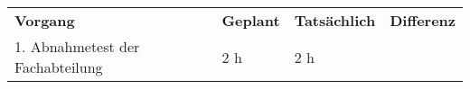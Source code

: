 \begin{tabular}{llll}
\rowcolor{heading}\textbf{Vorgang} & \textbf{Geplant} & \textbf{Tatsächlich} & \textbf{Differenz} \\
1. Abnahmetest der Fachabteilung & 2 h   & 2 h   &  \\
\end{tabular}
